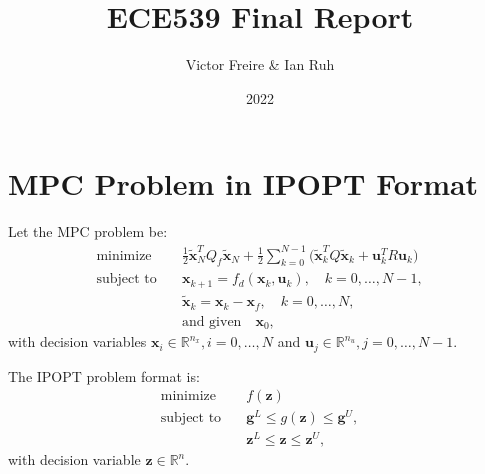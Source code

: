 \documentclass[12pt, letterpaper]{report}
\title{ECE539 Final Report}
\author{Victor Freire \& Ian Ruh}
\date{2022}
\newcommand{\vect}[1]{\boldsymbol{\mathbf{#1}}}
\begin{document}
\maketitle

\section*{MPC Problem in IPOPT Format}
Let the MPC problem be:
\begin{align} \label{NMPC} \tag{NMPC}
  \text{minimize} \quad  &\frac{1}{2}
  \tilde{\vect{x}}_N^TQ_f\tilde{\vect{x}}_N + \frac{1}{2}\sum_{k=0}^{N -
  1} \big(\tilde{\vect{x}}_k^T Q \tilde{\vect{x}}_k + \vect{u}_k^T R
  \vect{u}_k\big)\\
  \text{subject to} \quad & \vect{x}_{k+1} = f_d(\vect{x}_k,
  \vect{u}_k), \quad k = 0, \ldots, N-1, \nonumber\\
  &\tilde{\vect{x}}_k = \vect{x}_k - \vect{x}_f, \quad k = 0, \dots,
  N\nonumber,\\
  &\text{and given} \quad \vect{x}_0, \nonumber
\end{align}
with decision variables $\vect{x}_{i}\in \mathbb{R}^{n_x}, i =
0,\ldots,N$ and $\vect{u}_{j}\in\mathbb{R}^{n_u}, j = 0,\ldots,N-1$.

The IPOPT problem format is:
\begin{align} \label{IPOPT} \tag{IPOPT}
  \text{minimize} \quad &f(\vect{z})\\
  \text{subject to} \quad &\vect{g}^L \leq g(\vect{z}) \leq
  \vect{g}^U, \nonumber\\
  &\vect{z}^L \leq \vect{z} \leq \vect{z}^U, \nonumber
\end{align}
with decision variable $\vect{z}\in\mathbb{R}^n$.
\end{document}

